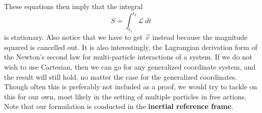 These equations then imply that the integral \begin{equation}
  S=\int_{t_{1}}^{t_{2}} \mathcal{L}\: dt 
\end{equation}
is stationary. Also notice that we have to get $\vec{v}$ instead because the magnitude squared is cancelled out. It is also interestingly, the Lagrangian derivation form of the Newton's second law for multi-particle interactions of a system. If we do not wish to use Cartesian, then we can go for any generalized coordinate system, and the result will still hold, no matter the case for the generalized coordinates. Though often this is preferably not included as a proof, we would try to tackle on this for our own, most likely in the setting of multiple particles in free actions. Note that our formulation is conducted in the \textbf{inertial reference frame}. 

